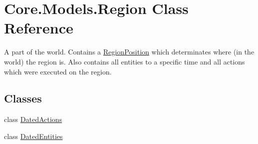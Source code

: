 \hypertarget{classCore_1_1Models_1_1Region}{\section{Core.\-Models.\-Region Class Reference}
\label{classCore_1_1Models_1_1Region}
}


A part of the world. Contains a \hyperlink{classCore_1_1Models_1_1RegionPosition}{Region\-Position} which determinates where (in the world) the region is. Also contains all entities to a specific time and all actions which were executed on the region.  


\subsection*{Classes}
\begin{DoxyCompactItemize}
\item 
class \hyperlink{classCore_1_1Models_1_1Region_1_1DatedActions}{Dated\-Actions}
\item 
class \hyperlink{classCore_1_1Models_1_1Region_1_1DatedEntities}{Dated\-Entities}
\end{DoxyCompactItemize}
